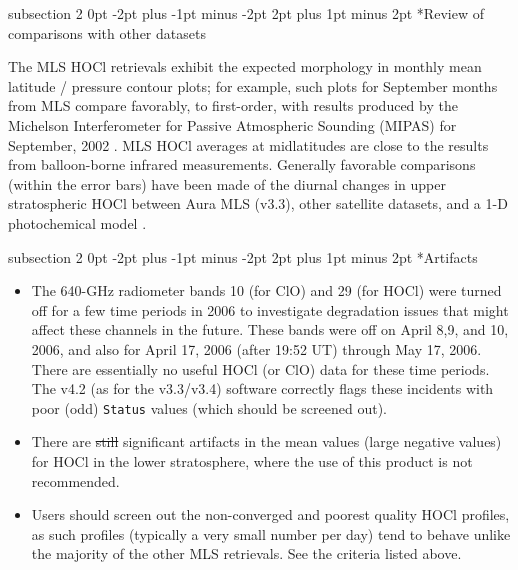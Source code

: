 \documentclass[11pt,draft]{report}
\makeatletter
\renewcommand{\subsection}{\@startsection%
  {subsection}%
  {2}%
  {0pt}%
  {-2pt plus -1pt minus -2pt}%
  {2pt plus 1pt minus 2pt}%
  {\large\sffamily\fontseries{sb}\selectfont\flushleft\color{SectionColor}\figureversion{tabular}}}%
\providecommand{\DIFdeltex}[1]{{\protect\color{red}\sout{#1}}}                      %
\providecommand{\DIFdelbegin}{} %
\providecommand{\DIFdelend}{} %
\providecommand{\DIFdel}[1]{\texorpdfstring{\DIFdeltex{#1}}{}} %
\makeatother
\begin{document}
\subsection*{Review of comparisons with other datasets}

The MLS HOCl retrievals exhibit the expected morphology in monthly mean
latitude / pressure contour plots; for example, such plots for September
months from MLS compare favorably, to first-order, with results produced
by the Michelson Interferometer for Passive Atmospheric Sounding (MIPAS)
for September, 2002 \citep{VonClarmannEtal06}.  MLS HOCl averages at
midlatitudes are close to the results from balloon-borne infrared
measurements. Generally favorable comparisons (within the error bars)
have been made of the diurnal changes in upper stratospheric HOCl
between Aura MLS (v3.3), other satellite datasets, and a 1-D
photochemical model \citep{KhosraviEtal13}.

\subsection*{Artifacts}
\begin{itemize} 
\item The 640-GHz radiometer bands 10 (for ClO) and 29 (for HOCl) were
  turned off for a few time periods in 2006 to investigate degradation
  issues that might affect these channels in the future.  These bands
  were off on April 8,9, and 10, 2006, and also for April 17, 2006
  (after 19:52 UT) through May 17, 2006.  There are essentially no
  useful HOCl (or ClO) data for these time periods.  The v4.2 (as for
  the v3.3/v3.4) software correctly flags these incidents with poor
  (odd) \texttt{Status} values (which should be screened out).
\item There are \DIFdelbegin \DIFdel{still }\DIFdelend significant artifacts in the mean values (large negative
  values) for HOCl in the lower stratosphere, where the use of this
  product is not recommended.
\item Users should screen out the non-converged and poorest quality HOCl
  profiles, as such profiles (typically a very small number per day)
  tend to behave unlike the majority of the other MLS retrievals.  See
  the criteria listed above.
\end{itemize}  
\end{document}
